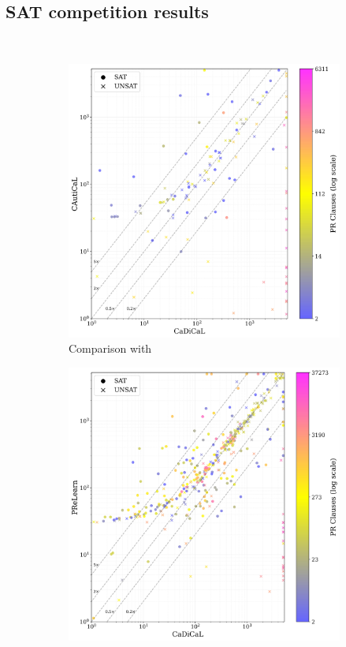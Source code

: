 \subsection{SAT competition results}~\label{subsec:eval-satcomp}

\begin{figure}[!t]
    \centering
    \begin{subfigure}[t]{0.45\textwidth}
        \centering
        \includegraphics[width=\textwidth]{figs/cadical_vs_cautical_nontrivial.jpg}
        \caption{Comparison with \cadical}
        \label{fig:cautical-vs-cadical}
    \end{subfigure}
    \begin{subfigure}[t]{0.45\textwidth}
        \centering
        \includegraphics[width=\textwidth]{figs/cadical_vs_prelearn_nontrivial.jpg}

\end{subfigure}
\end{figure}
